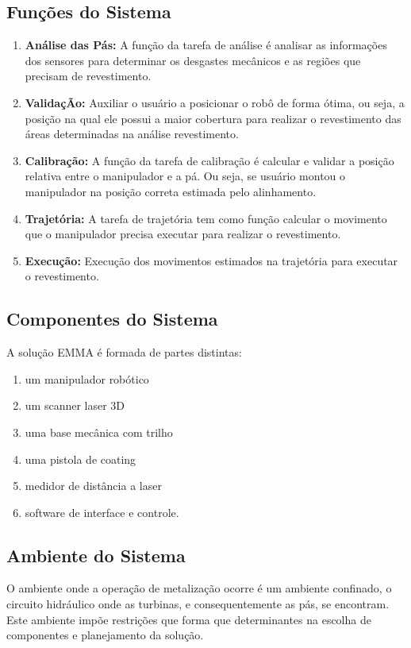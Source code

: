 \documentclass[12pt,a4paper]{article}
\begin{document}
\subsection{Funções do Sistema}
\begin {enumerate}
  \item \textbf{Análise das Pás:} A função da tarefa de análise é analisar as
  informações dos sensores para determinar os desgastes mecânicos e as regiões que precisam de revestimento.
  \item \textbf{ValidaçÃo:} Auxiliar o usuário a posicionar o robô de forma
  ótima, ou seja, a posição na qual ele possui a maior cobertura para realizar o revestimento das áreas determinadas na análise revestimento.
  \item \textbf {Calibração:} A função da tarefa de calibração é calcular e
  validar a posição relativa entre o manipulador e a pá. Ou seja, se usuário montou o manipulador na posição correta estimada pelo alinhamento.
  \item \textbf {Trajetória:} A tarefa de trajetória tem como função calcular o
  movimento que o manipulador precisa executar para realizar o revestimento.
  \item \textbf {Execução:} Execução dos movimentos estimados na trajetória para
  executar o revestimento.
\end{enumerate}

\subsection{Componentes do Sistema}
A solução EMMA é formada de partes distintas:
\begin {enumerate}
	\item um manipulador robótico
	\item um scanner laser 3D
	\item uma base mecânica com trilho
	\item uma pistola de coating
	\item medidor de distância a laser
	\item software de interface e controle.
\end {enumerate} 

\subsection {Ambiente do Sistema}
O ambiente onde a operação de metalização ocorre é um ambiente confinado, o circuito hidráulico onde as turbinas, e consequentemente as pás, se encontram. 
Este ambiente impõe restrições que forma que determinantes na escolha de componentes e planejamento da solução.
\end{document}
